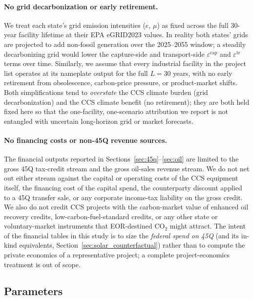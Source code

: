 \documentclass[11pt]{article}
\newcommand{\cotwo}{\ensuremath{\mathrm{CO_2}}}
\begin{document}
\paragraph{No grid decarbonization or early retirement.} We treat each state's grid emission intensities ($e$, $\mu$) as fixed across the full 30-year facility lifetime at their EPA eGRID2023 values. In reality both states' grids are projected to add non-fossil generation over the 2025--2055 window; a steadily decarbonizing grid would lower the capture-side and transport-side $\varepsilon^{\text{cap}}$ and $\varepsilon^{\text{tr}}$ terms over time. Similarly, we assume that every industrial facility in the project list operates at its nameplate output for the full $L = 30$ years, with no early retirement from obsolescence, carbon-price pressure, or product-market shifts. Both simplifications tend to \emph{overstate} the CCS climate burden (grid decarbonization) and the CCS climate benefit (no retirement); they are both held fixed here so that the one-facility, one-scenario attribution we report is not entangled with uncertain long-horizon grid or market forecasts.

\paragraph{No financing costs or non-45Q revenue sources.} The financial outputs reported in Sections~\ref{sec:45q}--\ref{sec:oil} are limited to the gross 45Q tax-credit stream and the gross oil-sales revenue stream. We do not net out either stream against the capital or operating costs of the CCS equipment itself, the financing cost of the capital spend, the counterparty discount applied to a 45Q transfer sale, or any corporate income-tax liability on the gross credit. We also do not credit CCS projects with the carbon-market value of enhanced oil recovery credits, low-carbon-fuel-standard credits, or any other state or voluntary-market instruments that EOR-destined \cotwo{} might attract. The intent of the financial tables in this study is to size the \emph{federal spend on 45Q} (and its in-kind equivalents, Section~\ref{sec:solar_counterfactual}) rather than to compute the private economics of a representative project; a complete project-economics treatment is out of scope.

\subsection{Parameters}
\label{sec:params}
\end{document}
